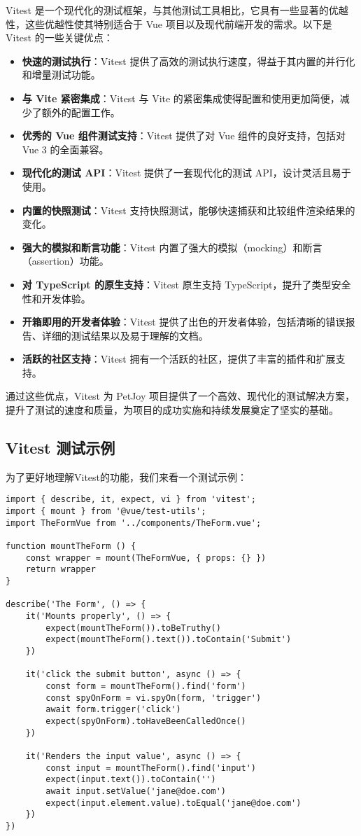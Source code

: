Vitest 是一个现代化的测试框架，与其他测试工具相比，它具有一些显著的优越性，这些优越性使其特别适合于 Vue 项目以及现代前端开发的需求。以下是 Vitest 的一些关键优点：

\begin{itemize}
    \item \textbf{快速的测试执行}：Vitest 提供了高效的测试执行速度，得益于其内置的并行化和增量测试功能。
    \item \textbf{与 Vite 紧密集成}：Vitest 与 Vite 的紧密集成使得配置和使用更加简便，减少了额外的配置工作。
    \item \textbf{优秀的 Vue 组件测试支持}：Vitest 提供了对 Vue 组件的良好支持，包括对 Vue 3 的全面兼容。
    \item \textbf{现代化的测试 API}：Vitest 提供了一套现代化的测试 API，设计灵活且易于使用。
    \item \textbf{内置的快照测试}：Vitest 支持快照测试，能够快速捕获和比较组件渲染结果的变化。
    \item \textbf{强大的模拟和断言功能}：Vitest 内置了强大的模拟（mocking）和断言（assertion）功能。
    \item \textbf{对 TypeScript 的原生支持}：Vitest 原生支持 TypeScript，提升了类型安全性和开发体验。
    \item \textbf{开箱即用的开发者体验}：Vitest 提供了出色的开发者体验，包括清晰的错误报告、详细的测试结果以及易于理解的文档。
    \item \textbf{活跃的社区支持}：Vitest 拥有一个活跃的社区，提供了丰富的插件和扩展支持。
\end{itemize}

通过这些优点，Vitest 为 PetJoy 项目提供了一个高效、现代化的测试解决方案，提升了测试的速度和质量，为项目的成功实施和持续发展奠定了坚实的基础。

\subsection{Vitest 测试示例}

为了更好地理解Vitest的功能，我们来看一个测试示例：

\begin{verbatim}
import { describe, it, expect, vi } from 'vitest';
import { mount } from '@vue/test-utils';
import TheFormVue from '../components/TheForm.vue';

function mountTheForm () {
	const wrapper = mount(TheFormVue, { props: {} })
	return wrapper
}

describe('The Form', () => {
	it('Mounts properly', () => {
		expect(mountTheForm()).toBeTruthy()
		expect(mountTheForm().text()).toContain('Submit')
	})
	
	it('click the submit button', async () => {
		const form = mountTheForm().find('form')
		const spyOnForm = vi.spyOn(form, 'trigger')
		await form.trigger('click')
		expect(spyOnForm).toHaveBeenCalledOnce()
	})
	
	it('Renders the input value', async () => {
		const input = mountTheForm().find('input')
		expect(input.text()).toContain('')
		await input.setValue('jane@doe.com')
		expect(input.element.value).toEqual('jane@doe.com')
	})
})
\end{verbatim}

